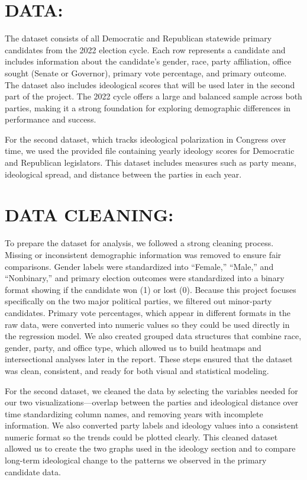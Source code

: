 \documentclass[
]{article}
\begin{document}
\section{DATA:}\label{data}

The dataset consists of all Democratic and Republican statewide primary
candidates from the 2022 election cycle. Each row represents a candidate
and includes information about the candidate's gender, race, party
affiliation, office sought (Senate or Governor), primary vote
percentage, and primary outcome. The dataset also includes ideological
scores that will be used later in the second part of the project. The
2022 cycle offers a large and balanced sample across both parties,
making it a strong foundation for exploring demographic differences in
performance and success.

For the second dataset, which tracks ideological polarization in
Congress over time, we used the provided file containing yearly ideology
scores for Democratic and Republican legislators. This dataset includes
measures such as party means, ideological spread, and distance between
the parties in each year.

\section{DATA CLEANING:}\label{data-cleaning}

To prepare the dataset for analysis, we followed a strong cleaning
process. Missing or inconsistent demographic information was removed to
ensure fair comparisons. Gender labels were standardized into
``Female,'' ``Male,'' and ``Nonbinary,'' and primary election outcomes
were standardized into a binary format showing if the candidate won (1)
or lost (0). Because this project focuses specifically on the two major
political parties, we filtered out minor-party candidates. Primary vote
percentages, which appear in different formats in the raw data, were
converted into numeric values so they could be used directly in the
regression model. We also created grouped data structures that combine
race, gender, party, and office type, which allowed us to build heatmaps
and intersectional analyses later in the report. These steps ensured
that the dataset was clean, consistent, and ready for both visual and
statistical modeling.

For the second dataset, we cleaned the data by selecting the variables
needed for our two visualizations---overlap between the parties and
ideological distance over time standardizing column names, and removing
years with incomplete information. We also converted party labels and
ideology values into a consistent numeric format so the trends could be
plotted clearly. This cleaned dataset allowed us to create the two
graphs used in the ideology section and to compare long-term ideological
change to the patterns we observed in the primary candidate data.
\end{document}
